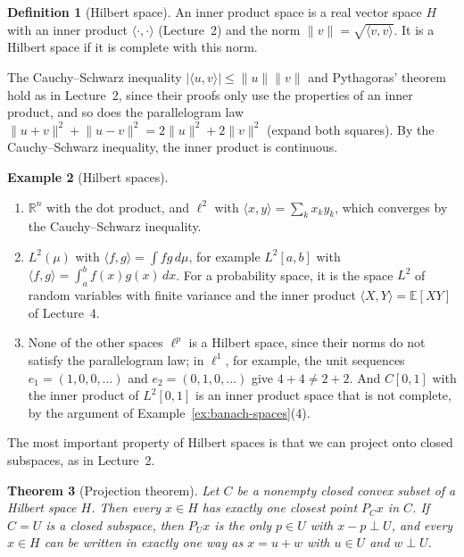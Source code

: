 \documentclass[11pt]{article}
\newcommand{\norm}[1]{\lVert #1 \rVert}
\newcommand{\ip}[2]{\langle #1, #2 \rangle}
\newcommand{\E}{\mathbb{E}}
\theoremstyle{definition}
\newtheorem{definition}{Definition}[section]
\newtheorem{example}[definition]{Example}
\theoremstyle{plain}
\newtheorem{theorem}[definition]{Theorem}
\theoremstyle{remark}
\begin{document}
\begin{definition}[Hilbert space]\label{def:hilbert}
    An inner product space is a real vector space $H$ with an inner product $\ip{\cdot}{\cdot}$ (Lecture~2) and the norm $\norm{v} = \sqrt{\ip{v}{v}}$. It is a Hilbert space if it is complete with this norm.
\end{definition}

The Cauchy--Schwarz inequality $|\ip{u}{v}| \leq \norm{u}\norm{v}$ and Pythagoras' theorem hold as in Lecture~2, since their proofs only use the properties of an inner product, and so does the parallelogram law $\norm{u + v}^2 + \norm{u - v}^2 = 2\norm{u}^2 + 2\norm{v}^2$ (expand both squares). By the Cauchy--Schwarz inequality, the inner product is continuous.

\begin{example}[Hilbert spaces]\label{ex:hilbert-spaces}
    \begin{enumerate}
        \item $\mathbb{R}^n$ with the dot product, and $\ell^2$ with $\ip{x}{y} = \sum_k x_ky_k$, which converges by the Cauchy--Schwarz inequality.
        \item $L^2(\mu)$ with $\ip{f}{g} = \int fg\, d\mu$, for example $L^2[a, b]$ with $\ip{f}{g} = \int_a^b f(x)g(x)\, dx$. For a probability space, it is the space $L^2$ of random variables with finite variance and the inner product $\ip{X}{Y} = \E[XY]$ of Lecture~4.
        \item None of the other spaces $\ell^p$ is a Hilbert space, since their norms do not satisfy the parallelogram law; in $\ell^1$, for example, the unit sequences $e_1 = (1, 0, 0, \ldots)$ and $e_2 = (0, 1, 0, \ldots)$ give $4 + 4 \neq 2 + 2$. And $C[0, 1]$ with the inner product of $L^2[0, 1]$ is an inner product space that is not complete, by the argument of Example~\ref{ex:banach-spaces}(4).
    \end{enumerate}
\end{example}

The most important property of Hilbert spaces is that we can project onto closed subspaces, as in Lecture~2.

\begin{theorem}[Projection theorem]\label{thm:projection}
    Let $C$ be a nonempty closed convex subset of a Hilbert space $H$. Then every $x \in H$ has exactly one closest point $P_Cx$ in $C$. If $C = U$ is a closed subspace, then $P_Ux$ is the only $p \in U$ with $x - p \perp U$, and every $x \in H$ can be written in exactly one way as $x = u + w$ with $u \in U$ and $w \perp U$.
\end{theorem}
\end{document}
